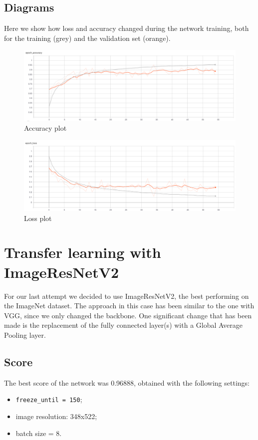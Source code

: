 \documentclass[12pt,a4paper]{report}
\begin{document}
		\subsection{Diagrams}
Here we show how loss and accuracy changed during the network training, both for the training (grey) and the validation set (orange).
		\begin{figure}[H]
			\includegraphics[scale = 0.5, center]{vgg accuracy}
			\caption{Accuracy plot}
		\end{figure}
		\begin{figure}[H]
			\includegraphics[scale = 0.5, center]{vgg loss}
			\caption{Loss plot}
		\end{figure}

\section{Transfer learning with ImageResNetV2}
For our last attempt we decided to use ImageResNetV2, the best performing on the ImageNet dataset. The approach in this case has been similar to the one with VGG, since we only changed the backbone. One significant change that has been made is the replacement of the fully connected layer(s) with a Global Average Pooling layer.
\subsection{Score}
	The best score of the network was 0.96888, obtained with the following settings:
	\begin{itemize}
		\item	\texttt{freeze\_until = 150};
		\item image resolution: 348x522;
		\item batch size = 8.
	\end{itemize}
\end{document}
